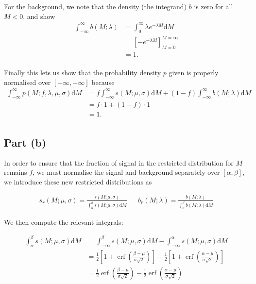 \documentclass[12pt]{article}
\DeclareMathOperator{\erf}{erf}
\begin{document}
For the background, we note that the density (the integrand) $b$ is zero for all $M<0$, and show
\begin{align*}
    \int_{-\infty}^\infty b(M;\lambda) & = \int_0^\infty \lambda e^{-\lambda M}\mathrm{d}M \\
    & = \left[-e^{-\lambda M}\right]_{M=0}^{M=\infty} \\
    & = 1. \\
\end{align*}

Finally this lets us show that the probability density $p$ given is properly normalised over $[-\infty,+\infty]$ because
\begin{align*}
    \int_{-\infty}^\infty p(M; f,\lambda,\mu,\sigma)\mathrm{d}M & = f\int_{-\infty}^\infty s(M;\mu, \sigma)\mathrm{d}M + (1-f)\int_{-\infty}^\infty b(M;\lambda)\mathrm{d}M \\
    & = f\cdot 1 + (1-f)\cdot 1\\
    & = 1. \\
\end{align*}

\subsection*{Part (b)}

In order to ensure that the fraction of signal in the restricted distribution for $M$ remains $f$, we must normalise the signal and background separately over $[\alpha,\beta]$, we introduce these new restricted distributions as

\begin{align*}
    s_r(M;\mu,\sigma) = \frac{s(M;\mu,\sigma)}{\int_\alpha^\beta s(M;\mu,\sigma)\mathrm{d}M} && b_r(M;\lambda) = \frac{b(M;\lambda)}{\int_\alpha^\beta b(M;\lambda)\mathrm{d}M}
\end{align*}

We then compute the relevant integrals:

\begin{align*}
    \int_\alpha^\beta s(M;\mu,\sigma)\mathrm{d}M & = \int_{-\infty}^\beta s(M;\mu,\sigma)\mathrm{d}M - \int_{-\infty}^\alpha s(M;\mu,\sigma)\mathrm{d}M \\
    & = \frac{1}{2}\left[1 + \erf\left(\frac{\beta - \mu}{\sigma\sqrt{2}}\right)\right] - \frac{1}{2}\left[1 + \erf\left(\frac{\alpha - \mu}{\sigma\sqrt{2}}\right)\right] \\
    & = \frac{1}{2}\erf\left(\frac{\beta - \mu}{\sigma\sqrt{2}}\right) - \frac{1}{2}\erf\left(\frac{\alpha - \mu}{\sigma\sqrt{2}}\right)
\end{align*}
\end{document}
